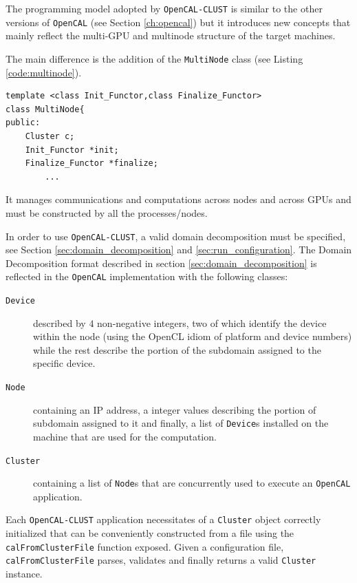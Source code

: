The programming model adopted by \texttt{OpenCAL-CLUST}  is similar to the other versions of \texttt{OpenCAL} (see Section \ref{ch:opencal}) but it introduces new concepts that mainly reflect the multi-GPU and multinode structure of the target machines.

The main difference is the addition of the \texttt{MultiNode} class (see Listing \ref{code:multinode}).
\begin{lstlisting}
template <class Init_Functor,class Finalize_Functor>
class MultiNode{
public:
    Cluster c;
    Init_Functor *init;
    Finalize_Functor *finalize;
        ...
\end{lstlisting}
It manages communications and computations across nodes and across GPUs and must be constructed by all the processes/nodes.

In order to use \texttt{OpenCAL-CLUST}, a valid domain decomposition must be specified, see Section \ref{sec:domain_decomposition} and \ref{sec:run_configuration}.
The Domain Decomposition format described in section \ref{sec:domain_decomposition} is reflected in the \texttt{OpenCAL} implementation with the following classes:
\begin{description}
    \item[\texttt{Device}] described by $4$ non-negative integers, two of which identify the device  within the node (using the OpenCL idiom of platform and device numbers) while the rest describe the portion of the subdomain assigned to the specific device.
    \item[\texttt{Node}] containing an IP address, a integer values describing the portion of subdomain assigned to it and finally, a list of \texttt{Device}s installed on the machine that are used for the computation.
    \item [\texttt{Cluster}] containing a list of \texttt{Node}s that are concurrently used to  execute an \texttt{OpenCAL} application.
\end{description}
Each \texttt{OpenCAL-CLUST}  application necessitates of a \texttt{Cluster} object correctly initialized that can be conveniently constructed from a file using the \texttt{calFromClusterFile} function exposed. Given a configuration file, \texttt{calFromClusterFile} parses, validates and finally returns a valid \texttt{Cluster} instance.


